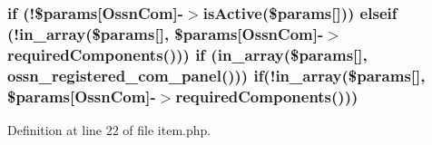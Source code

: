 \subsubsection[{\texorpdfstring{if}{if}}]{\setlength{\rightskip}{0pt plus 5cm}if (!\$params\mbox{[}\textquotesingle{}Ossn\+Com\textquotesingle{}\mbox{]}-\/$>$is\+Active(\$params\mbox{[}\textquotesingle{}\mbox{]})) {\bf elseif} (!in\+\_\+array(\$params\mbox{[}\textquotesingle{}\mbox{]}, \$params\mbox{[}\textquotesingle{}Ossn\+Com\textquotesingle{}\mbox{]}-\/$>$required\+Components())) if (in\+\_\+array(\$params\mbox{[}\textquotesingle{}\mbox{]}, {\bf ossn\+\_\+registered\+\_\+com\+\_\+panel}())) if(!in\+\_\+array(\$params\mbox{[}\textquotesingle{}\mbox{]}, \$params\mbox{[}\textquotesingle{}Ossn\+Com\textquotesingle{}\mbox{]}-\/$>$required\+Components()))}\hypertarget{system_2plugins_2default_2admin_2components_2list_2item_8php_aca419c38bc7ef1362e2f43803b38217c}{}\label{system_2plugins_2default_2admin_2components_2list_2item_8php_aca419c38bc7ef1362e2f43803b38217c}


Definition at line 22 of file item.\+php.


